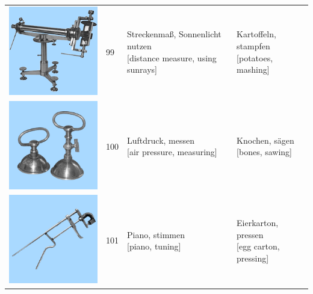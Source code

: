 \documentclass[
  english,
  doc,12pt,twoside,floatsintext]{apa7}
\begin{document}
\begin{center}
\begin{ThreePartTable}
{\begin{longtable}{llll}
\includegraphics[valign=c, scale=0.23]{../materials/unfamiliar/99.png} & 99 & \makecell[l]{Streckenmaß, Sonnenlicht nutzen\\{[distance measure, using sunrays]}} & \makecell[l]{Kartoffeln, stampfen\\{[potatoes, mashing]}}\\
\includegraphics[valign=c, scale=0.23]{../materials/unfamiliar/100.png} & 100 & \makecell[l]{Luftdruck, messen\\{[air pressure, measuring]}} & \makecell[l]{Knochen, sägen\\{[bones, sawing]}}\\
\includegraphics[valign=c, scale=0.23]{../materials/unfamiliar/101.png} & 101 & \makecell[l]{Piano, stimmen\\{[piano, tuning]}} & \makecell[l]{Eierkarton, pressen\\{[egg carton, pressing]}}\\

\end{longtable}}
\end{ThreePartTable}
\end{center}
\end{document}
